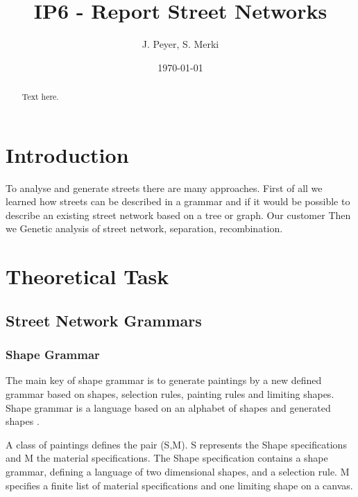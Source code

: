 \documentclass[11pt, a4paper]{report}
\begin{document}
\begin{titlepage}
    \title{IP6 - Report Street Networks}
    \date{\today}
    \author{J. Peyer, S. Merki}
    \maketitle
\end{titlepage}
\setcounter{page}{1}

\tableofcontents



\begin{abstract}
    Text here.
\end{abstract}

\chapter{Introduction}
To analyse and generate streets there are many approaches. First of all we learned how streets can be described in a grammar and if it would be possible to describe an existing street network based on a tree or graph. Our customer Then we 
Genetic analysis of street network, separation, recombination.
\chapter{Theoretical Task}
\section{Street Network Grammars}
\subsection{Shape Grammar}
The main key of shape grammar is to generate paintings by a new defined grammar based on shapes, selection rules, painting rules and limiting shapes. Shape grammar is a language based on an alphabet of shapes and generated shapes \citep{shapeGrammars:1972}. 

A class of paintings defines the pair (S,M). S represents the Shape specifications and M the material specifications. The Shape specification contains a shape grammar, defining a language of two dimensional shapes, and a selection rule. M specifies a finite list of material specifications and one limiting shape on a canvas.
\end{document}
